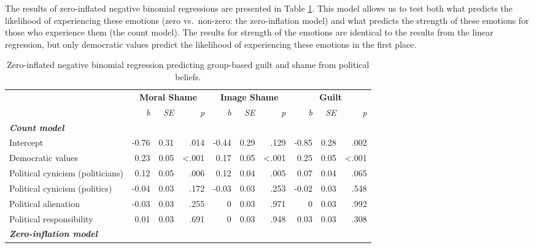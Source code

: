 \documentclass[
]{article}
\begin{document}
The results of zero-inflated negative binomial regressions are presented in Table \ref{tab:TableS2}. This model allows us to test both what predicts the likelihood of experiencing these emotions (zero vs.~non-zero: the zero-inflation model) and what predicts the strength of these emotions for those who experience them (the count model). The results for strength of the emotions are identical to the results from the linear regression, but only democratic values predict the likelihood of experiencing these emotions in the first place.

\begin{table}[H]

\caption{\label{tab:TableS2}Zero-inflated negative binomial regression predicting group-based guilt and shame from political beliefs.}
\centering
\fontsize{8}{10}\selectfont
\begin{tabular}[t]{lrrrrrrrrr}
\toprule
\multicolumn{1}{c}{\textbf{}} & \multicolumn{3}{c}{\textbf{Moral Shame}} & \multicolumn{3}{c}{\textbf{Image Shame}} & \multicolumn{3}{c}{\textbf{Guilt}} \\
\cmidrule(l{3pt}r{3pt}){2-4} \cmidrule(l{3pt}r{3pt}){5-7} \cmidrule(l{3pt}r{3pt}){8-10}
\em{ } & \em{b} & \em{SE} & \em{p} & \em{b} & \em{SE} & \em{p} & \em{b} & \em{SE} & \em{p}\\
\midrule
\em{\textbf{Count model}} & \em{\textbf{}} & \em{\textbf{}} & \em{\textbf{}} & \em{\textbf{}} & \em{\textbf{}} & \em{\textbf{}} & \em{\textbf{}} & \em{\textbf{}} & \em{\textbf{}}\\
\midrule
Intercept & -0.76 & 0.31 & .014 & -0.44 & 0.29 & .129 & -0.85 & 0.28 & .002\\
Democratic values & 0.23 & 0.05 & <.001 & 0.17 & 0.05 & <.001 & 0.25 & 0.05 & <.001\\
Political cynicism (politicians) & 0.12 & 0.05 & .006 & 0.12 & 0.04 & .005 & 0.07 & 0.04 & .065\\
Political cynicism (politics) & -0.04 & 0.03 & .172 & -0.03 & 0.03 & .253 & -0.02 & 0.03 & .548\\
\addlinespace
Political alienation & -0.03 & 0.03 & .255 & 0 & 0.03 & .971 & 0 & 0.03 & .992\\
Political responsibility & 0.01 & 0.03 & .691 & 0 & 0.03 & .948 & 0.03 & 0.03 & .308\\
\midrule
\em{\textbf{Zero-inflation model}} & \em{\textbf{}} & \em{\textbf{}} & \em{\textbf{}} & \em{\textbf{}} & \em{\textbf{}} & \em{\textbf{}} & \em{\textbf{}} & \em{\textbf{}} & \em{\textbf{}}\\

\end{tabular}
\end{table}
\end{document}
